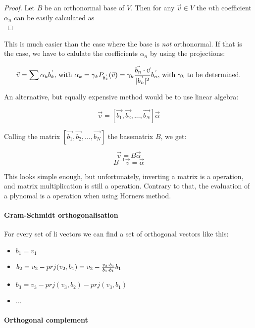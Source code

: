 \begin{proof} Let $B$ be an orthonormal base of $V$. Then for any $\vec{v} \in V$ the $n$th coefficient $\alpha_n$ can be easily calculated as  \\


\end{proof}

This is much easier than the case where the base is \emph{not} orthonormal. If that is the case, we have to calulate the coefficients $\alpha_n$ by using the projections: 

$$ \vec{v} = \sum \alpha_k \vec{b_k} \text{, with } \alpha_k = \gamma_k P_{\vec{b_k}}(\vec{v}) =  \gamma_k \frac{\vec{b_n} \cdot \vec{v}}{|\vec{b_n}|^2}\vec{b_n} \text{, with  $\gamma_k$ to be determined.}$$

An alternative, but equally expensive method would be to use linear algebra:

$$ \vec{v} = [\vec{b_1}, \vec{b_2}, ..., \vec{b_N}  ] \vec{\alpha} $$

Calling the matrix $[\vec{b_1}, \vec{b_2}, ..., \vec{b_N}  ]$ the basematrix $B$, we get: 

$$ \vec{v} = B \vec{\alpha} $$
$$ B^{-1} \vec{v} = \vec{\alpha} $$

This looks simple enough, but unfortunately, inverting a matrix is a  operation, and matrix multiplication is still a  operation. Contrary to that, the evaluation of a plynomal is a  operation when using Horners method. 

\paragraph{Gram-Schmidt orthogonalisation} For every set of li vectors we can find a set of orthogonal vectors like this: 
\begin{itemize}
    \item $b_1 = v_1$
    \item $b_2 = v_2 - prj(v_2, b_1) = v_2 - \frac{v_2 \cdot b_1}{b_1 \cdot b_1}b_1$
    \item $b_3 = v_3 - prj(v_3, b_2) - prj(v_3, b_1)$
    \item ...
\end{itemize}

\paragraph{Orthogonal complement}


